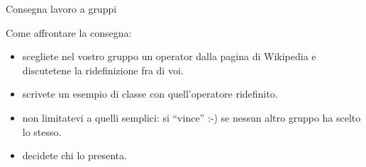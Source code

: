 \documentclass[xcolor={dvipsnames, svgnames, x11names, table}, 10pt]{beamer}
\begin{document}
\begin{frame}{Consegna lavoro a gruppi}

Come affrontare la consegna:
\begin{itemize}
    \item scegliete nel vostro gruppo un operator dalla pagina di Wikipedia e discutetene la ridefinizione fra di voi.
    \item scrivete un esempio di classe con quell'operatore ridefinito.
    \item non limitatevi a quelli semplici: si \enquote{vince} :-) se nessun altro gruppo ha scelto lo stesso.
    \item decidete chi lo presenta.
\end{itemize}

\end{frame}

\Riconoscimenti
\end{document}
